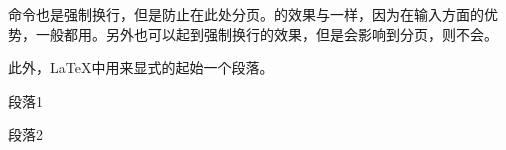 \texinline{\\*}命令也是强制换行，但是防止在此处分页。\texinline{\newline}的效果与\texinline{\\}一样，因为\texinline{\\}在输入方面的优势，一般都用\texinline{\\}。另外\texinline{\linebreak}也可以起到强制换行的效果，但是\texinline{\linebreak}会影响到分页，\texinline{\newline}则不会。

此外，\LaTeX 中用\texinline{\par}来显式的起始一个段落。

\begin{texlst}
	段落1\par 段落2
\end{texlst}
